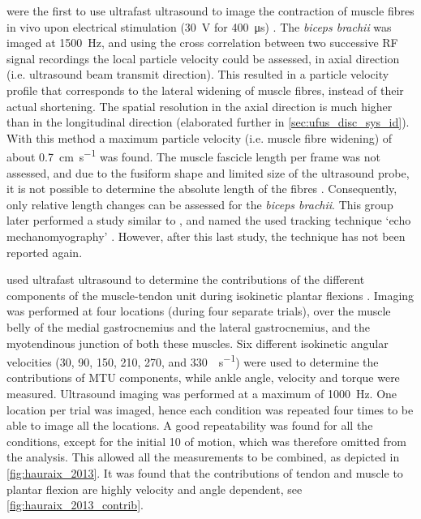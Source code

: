 \citeauthor{deffieux_ultrafast_2006} were the first to use ultrafast ultrasound to image the contraction of muscle fibres in vivo upon electrical stimulation (\SI{30}{\volt} for \SI{400}{\micro\second}) \cite{deffieux_ultrafast_2006}. The \textit{biceps brachii} was imaged at \SI{1500}{\hertz}, and using the cross correlation between two successive RF signal recordings the local particle velocity could be assessed, in axial direction (i.e. ultrasound beam transmit direction). This resulted in a particle velocity profile that corresponds to the lateral widening of muscle fibres, instead of their actual shortening. The spatial resolution in the axial direction is much higher than in the longitudinal direction (elaborated further in \autoref{sec:ufus_disc_sys_id}). With this method a maximum particle velocity (i.e. muscle fibre widening) of about \SI{0.7}{\centi\meter\per\second} was found. The muscle fascicle length per frame was not assessed, and due to the fusiform shape and limited size of the ultrasound probe, it is not possible to determine the absolute length of the fibres \cite{hodges_measurement_2003}. Consequently, only relative length changes can be assessed for the \textit{biceps brachii}. This group later performed a study similar to \cite{deffieux_ultrafast_2006}, and named the used tracking technique `echo mechanomyography' \cite{deffieux_assessment_2008}. However, after this last study, the technique has not been reported again. 


\citeauthor{hauraix_shortening_2013} used ultrafast ultrasound to determine the contributions of the different components of the muscle-tendon unit during isokinetic plantar flexions \cite{hauraix_shortening_2013}. Imaging was performed at four locations (during four separate trials), over the muscle belly of the medial gastrocnemius and the lateral gastrocnemius, and the myotendinous junction of both these muscles. Six different isokinetic angular velocities (30, 90, 150, 210, 270, and \SI{330}{\deg\per\second}) were used to determine the contributions of MTU components, while ankle angle, velocity and torque were measured. Ultrasound imaging was performed at a maximum of \SI{1000}{\hertz}. One location per trial was imaged, hence each condition was repeated four times to be able to image all the locations. A good repeatability was found for all the conditions, except for the initial \SI{10}{\deg} of motion, which was therefore omitted from the analysis. This allowed all the measurements to be combined, as depicted in \autoref{fig:hauraix_2013}. It was found that the contributions of tendon and muscle to plantar flexion are highly velocity and angle dependent, see \autoref{fig:hauraix_2013_contrib}. 


